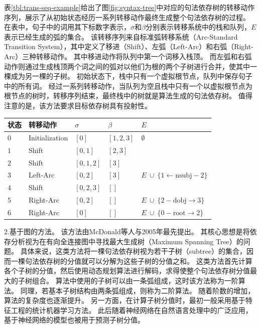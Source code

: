 表\ref{tbl:trans-seq-example}给出了图\ref{fig:syntax-tree}中对应的句法依存树的转移动作序列，展示了从初始状态经历一系列转移动作最终生成整个句法依存树的过程。
在表中，句子中的词用其下标数字表示，$\sigma$和$\beta$分别表示转移系统中的栈和队列，$E$表示已经生成的弧的集合。
该转移序列来自标准弧转移系统（Arc-Standard Transition System），其中定义了移进（Shift）、左弧（Left-Arc）和右弧（Right-Arc）三种转移动作。
其中移进动作将队列中第一个词移入栈顶。
而左弧和右弧动作则通过生成栈顶两个词之间的弧对以他们为根的两个子树进行合并，使其中一棵成为另一棵的子树。
初始状态下，栈中只有一个虚拟根节点，队列中保存句子中的所有词。
经过一系列转移动作，当队列为空且栈中只有一个以虚拟根节点为根节点的树时，转移序列结束，最终栈中的树就是算法生成的句法依存树。
值得注意的是，该方法要求目标依存树具有投射性。

\begin{table}[thbp]
	\centering
	\small
	\renewcommand{\arraystretch}{1.2}
	\begin{tabular}{C{3em}L{7em}R{4.5em}L{4em}L{9em}}
		\hline
		\bf 状态 & \bf 转移动作 & $\sigma$ & $\beta$ & $E$ \\
		\hline
		$0$ & Initialization & $[0]$ & $[1, 2, 3]$ & $\emptyset $ \\
		$1$ & Shift & $[0, 1]$ & $[2, 3]$ &  \\
		$2$ & Shift & $[0, 1, 2]$ & $[3]$ &  \\
		$3$ & Left-Arc & $[0, 2]$ & $[3]$ & $E\ \cup\ \{1\leftarrow \textrm{nsubj}-2\}$ \\
		$4$ & Shift & $[0, 2, 3]$ & $[]$ &  \\
		$5$ & Right-Arc & $[0, 2]$ & $[]$ & $E\ \cup\ \{2- \textrm{dobj}\rightarrow3\}$ \\
        $6$ & Right-Arc & $[0]$ & $[]$ & $E\ \cup\ \{0- \textrm{root}\rightarrow2\}$ \\
		\hline
	\end{tabular}
\end{table}

2.基于图的方法。
该方法由McDonald等人\cite{mcdonald-etal-2005-online}与2005年最先提出。
其核心思想是将依存分析视为在有向全连接图中寻找最大生成树（Maximum Spanning Tree）的问题。
具体来说，这类方法将一棵句法依存树视为若干子树（subtree）的集合，因而一棵句法依存树的分值就可以分解为这些子树的分值之和。
这类方法首先计算各个子树的分值，然后使用动态规划算法进行解码，求得使整个句法依存树分值最大的子树组合。
算法中使用的子树可以由一条弧组成，这时该方法称为一阶算法。
同理，若基本子树结构由两条弧组成，则称为二阶算法。\cite{carreras-2007-experiments}
随着阶数的增加，算法的复杂度也逐渐提升。
另一方面，在计算子树分值时，最初一般采用基于特征工程的统计机器学习方法。
此后随着神经网络在自然语言处理中的广泛应用，基于神经网络的模型也被用于预测子树分值。

